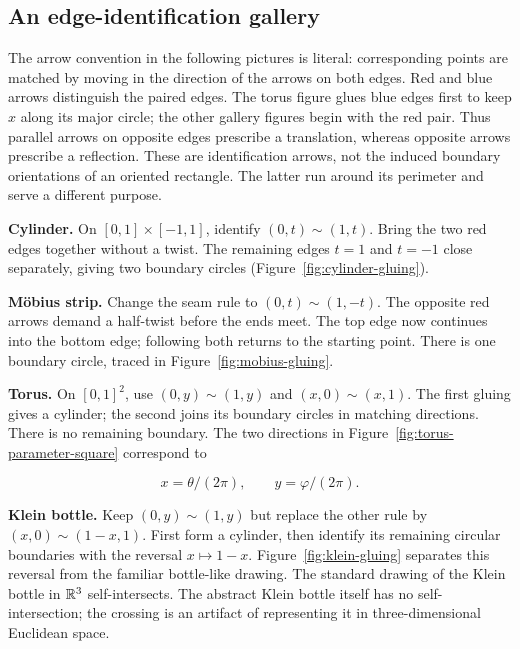 \subsection{An edge-identification gallery}\label{sec:gluing-gallery}
The arrow convention in the following pictures is literal: corresponding
points are matched by moving in the direction of the arrows on both edges.
Red and blue arrows distinguish the paired edges. The torus figure glues
blue edges first to keep $x$ along its major circle; the other gallery
figures begin with the red pair. Thus parallel arrows on opposite edges prescribe a translation,
whereas opposite arrows prescribe a reflection. These are identification
arrows, not the induced boundary orientations of an oriented rectangle.
The latter run around its perimeter and serve a different purpose.

\textbf{Cylinder.} On $[0,1]\times[-1,1]$, identify
$(0,t)\sim(1,t)$. Bring the two red edges together without a twist.
The remaining edges $t=1$ and $t=-1$ close separately, giving two boundary
circles (Figure~\ref{fig:cylinder-gluing}).

\FloatBarrier

\textbf{M\"obius strip.} Change the seam rule to
$(0,t)\sim(1,-t)$. The opposite red arrows demand a half-twist before
the ends meet. The top edge now continues into the bottom edge;
following both returns to the starting point. There is one boundary
circle, traced in Figure~\ref{fig:mobius-gluing}.

\FloatBarrier

\textbf{Torus.} On $[0,1]^2$, use
$(0,y)\sim(1,y)$ and $(x,0)\sim(x,1)$. The first gluing gives a cylinder;
the second joins its boundary circles in matching directions. There is
no remaining boundary. The two directions in
Figure~\ref{fig:torus-parameter-square} correspond to

\[
x=\theta/(2\pi),\qquad y=\varphi/(2\pi).
\]


\textbf{Klein bottle.} Keep $(0,y)\sim(1,y)$ but replace the other rule by
$(x,0)\sim(1-x,1)$. First form a cylinder, then identify its remaining
circular boundaries with the reversal $x\mapsto1-x$.
Figure~\ref{fig:klein-gluing} separates this reversal from the familiar
bottle-like drawing. The standard drawing of the Klein bottle in $\mathbb{R}^3$
self-intersects. The abstract Klein bottle itself has no self-intersection;
the crossing is an artifact of representing it in three-dimensional
Euclidean space.

\FloatBarrier

